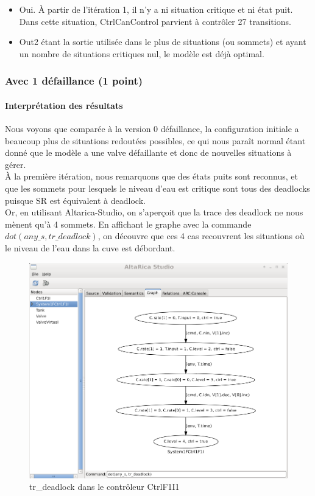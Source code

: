 \documentclass[a4paper]{book}
\begin{document}
\begin{itemize}
	\item Oui. À partir de l'itération 1, il n'y a ni situation critique et ni état puit. Dans cette situation, CtrlCanControl parvient à contrôler 27 transitions.
	\item Out2 étant la sortie utilisée dans le plus de situations (ou sommets) et ayant un nombre de situations critiques nul, le modèle est déjà optimal.
\end{itemize}

\subsubsection{Avec 1 défaillance (1 point)}





\paragraph{Interprétation des résultats}

Nous voyons que comparée à la version 0 défaillance, la configuration initiale a beaucoup plus de situations redoutées possibles, ce qui nous paraît normal étant donné que le modèle a une valve défaillante et donc de nouvelles situations à gérer. \\
À la première itération, nous remarquons que des états puits sont reconnus, et que les sommets pour lesquels le niveau d'eau est critique sont tous des deadlocks puisque SR est équivalent à deadlock. \\ 
Or, en utilisant Altarica-Studio, on s'aperçoit que la trace des deadlock ne nous mènent qu'à 4 sommets. En affichant le graphe avec la commande $dot(any\_s, tr\_deadlock)$, on découvre que ces 4 cas recouvrent les situations où le niveau de l'eau dans la cuve est débordant.

\begin{figure}[H]
  \centering
  \includegraphics[width=14cm]{img/CtrlF1I1.png}
  \caption{tr\_deadlock dans le contrôleur CtrlF1I1}
\end{figure}
\end{document}
